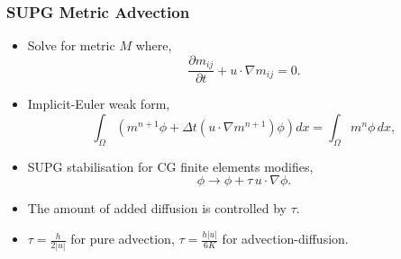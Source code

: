 \documentclass{beamer}
\begin{document}
  \begin{frame}
	\frametitle{SUPG Metric Advection}
	\begin{itemize}
		\item Solve for metric $M$ where, \[\frac{\partial m_{ij}}{\partial t} + u \cdot \nabla m_{ij} = 0.\]
		\item Implicit-Euler weak form, \[\int_\Omega \left( m^{n+1} \phi + \Delta t (u \cdot \nabla m^{n+1}) \phi \right) dx = \int_\Omega m^n \phi \, dx,\]
		\item SUPG stabilisation for CG finite elements modifies, \[\phi \rightarrow \phi + \tau \, u \cdot \nabla \phi.\]
		\item The amount of added diffusion is controlled by $\tau$.
		\item $\tau = \frac{h}{2|u|}$ for pure advection, $\tau = \frac{h|u|}{6K}$ for advection-diffusion.
		\end{itemize}
  \end{frame}



  





\end{document}
